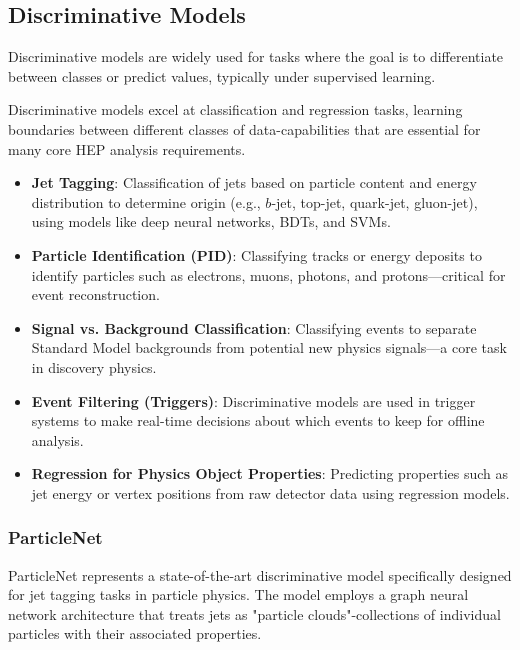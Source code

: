 \documentclass[letterpaper,12pt]{article}
\begin{document}
\begin{spacing}{1.125}
\subsection{Discriminative Models}

Discriminative models are widely used for tasks where the goal is to differentiate between classes or predict values, typically under supervised learning.

Discriminative models excel at classification and regression tasks, learning boundaries between different classes of data-capabilities that are essential for many core HEP analysis requirements.

\begin{itemize}
    \item \textbf{Jet Tagging}: Classification of jets based on particle content and energy distribution to determine origin (e.g., $b$-jet, top-jet, quark-jet, gluon-jet), using models like deep neural networks, BDTs, and SVMs.
    
    \item \textbf{Particle Identification (PID)}: Classifying tracks or energy deposits to identify particles such as electrons, muons, photons, and protons—critical for event reconstruction.
    
    \item \textbf{Signal vs. Background Classification}: Classifying events to separate Standard Model backgrounds from potential new physics signals—a core task in discovery physics.
    
    \item \textbf{Event Filtering (Triggers)}: Discriminative models are used in trigger systems to make real-time decisions about which events to keep for offline analysis.
    
    \item \textbf{Regression for Physics Object Properties}: Predicting properties such as jet energy or vertex positions from raw detector data using regression models.
\end{itemize}

\subsubsection{ParticleNet\cite{particlenet}}

ParticleNet represents a state-of-the-art discriminative model specifically designed for jet tagging tasks in particle physics. The model employs a graph neural network architecture that treats jets as "particle clouds"-collections of individual particles with their associated properties.




\end{spacing}
\end{document}
